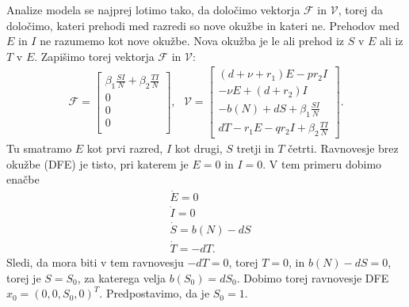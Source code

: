 \documentclass[a4paper,12pt]{article}
\newcommand{\F}{\mathcal F}
\newcommand{\V}{\mathcal V}
\begin{document}
Analize modela se najprej lotimo tako, da določimo vektorja 
\(\F\) in \(\V\), torej da določimo, kateri prehodi med razredi so nove okužbe in kateri ne. 
Prehodov med \(E\) in \(I\) ne razumemo kot nove okužbe. Nova okužba je le ali prehod iz \(S\) v \(E\) 
ali iz \(T\) v \(E\). Zapišimo torej vektorja \(\F\) in \(\V\):
\begin{align*}
    \F= 
        \begin{bmatrix}
        \beta_1\frac{SI}{N}+\beta_2\frac{TI}{N}\\
        0\\
        0\\
        0\\
        \end{bmatrix},\textrm{ }
        \V= 
        \begin{bmatrix}
        (d+\nu+r_1)E-pr_2I \\
        -\nu E +(d+r_2)I\\
        -b(N)+dS+\beta_1 \frac{SI}{N}\\
        dT-r_1E-qr_2I+\beta_2\frac{TI}{N}
        \end{bmatrix}.
\end{align*}
Tu smatramo \(E\) kot prvi razred, \(I\) kot drugi, \(S\) tretji in \(T\) četrti. 
Ravnovesje brez okužbe (DFE) je tisto, pri katerem je \(E=0\) in \(I=0\). 
V tem primeru dobimo enačbe 
\begin{align*}
    &\dot{E}=0\\
    &\dot{I}=0\\
    &\dot{S}=b(N)-dS\\
    &\dot{T}=-dT.
\end{align*}
Sledi, da mora biti v tem ravnovesju \(-dT=0\), torej \(T=0\), in 
\(b(N)-dS=0\), torej je \(S=S_0\), za katerega velja \(b(S_0)=dS_0\). 
Dobimo torej ravnovesje DFE \(x_0=(0,0,S_0,0)^T\). 
Predpostavimo, da je \(S_0=1\). 
\end{document}
